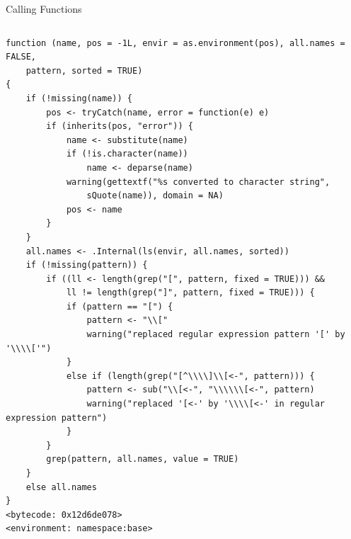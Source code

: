 \documentclass[
  11pt,
  ignorenonframetext,
]{beamer}
\begin{document}
\begin{frame}[fragile]{Calling Functions}
\begin{columns}[T,onlytextwidth]
\begin{column}{0.48\textwidth}
\begin{verbatim}
function (name, pos = -1L, envir = as.environment(pos), all.names = FALSE, 
    pattern, sorted = TRUE) 
{
    if (!missing(name)) {
        pos <- tryCatch(name, error = function(e) e)
        if (inherits(pos, "error")) {
            name <- substitute(name)
            if (!is.character(name)) 
                name <- deparse(name)
            warning(gettextf("%s converted to character string", 
                sQuote(name)), domain = NA)
            pos <- name
        }
    }
    all.names <- .Internal(ls(envir, all.names, sorted))
    if (!missing(pattern)) {
        if ((ll <- length(grep("[", pattern, fixed = TRUE))) && 
            ll != length(grep("]", pattern, fixed = TRUE))) {
            if (pattern == "[") {
                pattern <- "\\["
                warning("replaced regular expression pattern '[' by  '\\\\['")
            }
            else if (length(grep("[^\\\\]\\[<-", pattern))) {
                pattern <- sub("\\[<-", "\\\\\\[<-", pattern)
                warning("replaced '[<-' by '\\\\[<-' in regular expression pattern")
            }
        }
        grep(pattern, all.names, value = TRUE)
    }
    else all.names
}
<bytecode: 0x12d6de078>
<environment: namespace:base>
\end{verbatim}
\end{column}
\end{columns}
\end{frame}
\end{document}
